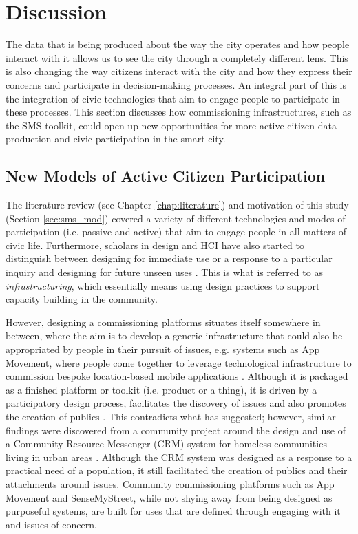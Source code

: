 \section{Discussion}
The data that is being produced about the way the city operates and how people interact with it allows us to see the city through a completely different lens. This is also changing the way citizens interact with the city and how they express their concerns and participate in decision-making processes. An integral part of this is the integration of civic technologies that aim to engage people to participate in these processes. This section discusses how commissioning infrastructures, such as the SMS toolkit, could open up new opportunities for more active citizen data production and civic participation in the smart city.

\subsection{New Models of Active Citizen Participation}
The literature review (see Chapter \ref{chap:literature}) and motivation of this study (Section \ref{sec:sms_mod}) covered a variety of different technologies and modes of participation (i.e. passive and active) that aim to engage people in all matters of civic life. Furthermore, scholars in design and HCI have also started to distinguish between designing for immediate use or a response to a particular inquiry and designing for future unseen uses \citep{ehn_participation_2008,bjorgvinsson_participatory_2010,dantec_infrastructuring_2013}. This is what is referred to as \textit{infrastructuring}, which essentially means using design practices to support capacity building in the community.

However, designing a commissioning platforms situates itself somewhere in between, where the aim is to develop a generic infrastructure that could also be appropriated by people in their pursuit of issues, e.g. systems such as App Movement, where people come together to leverage technological infrastructure to commission bespoke location-based mobile applications \citep{garbett_app_2016}. Although it is packaged as a finished platform or toolkit (i.e. product or a thing), it is driven by a participatory design process, facilitates the discovery of issues and also promotes the creation of publics \citep{dewey_public_1954}. This contradicts what \citet{ehn_participation_2008} has suggested; however, similar findings were discovered from a community project around the design and use of a Community Resource Messenger (CRM) system for homeless communities living in urban areas \citep{dantec_infrastructuring_2013}. Although the CRM system was designed as a response to a practical need of a population, it still facilitated the creation of publics and their attachments around issues. Community commissioning platforms such as App Movement and SenseMyStreet, while not shying away from being designed as purposeful systems, are built for uses that are defined through engaging with it and issues of concern.


